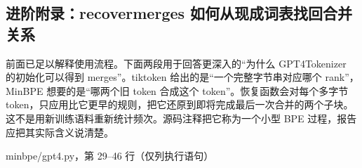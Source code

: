 \documentclass[11pt,a4paper]{article}
\newlength{\BpeDocTableWidth}
\newcommand{\BpeDocCodeInline}[1]{{\ttfamily #1}}
\newcommand{\BpeDocSubsection}[2]{\subsection{\texorpdfstring{#1}{#2}}}
\begin{document}
\BpeDocSubsection{进阶附录：\BpeDocCodeInline{recover\relax\allowbreak{}merges} 如何从现成词表找回合并关系}{进阶附录：recover\_merges 如何从现成词表找回合并关系}


前面已足以解释使用流程。下面两段用于回答更深入的“为什么 \BpeDocCodeInline{GPT4Tokenizer} 的初始化可以得到 \BpeDocCodeInline{merges}”。tiktoken 给出的是“一个完整字节串对应哪个 \BpeDocCodeInline{rank}”，MinBPE 想要的是“哪两个旧 \BpeDocCodeInline{token} 合成这个 \BpeDocCodeInline{token}”。恢复函数会对每个多字节 \BpeDocCodeInline{token}，只应用比它更早的规则，把它还原到即将完成最后一次合并的两个子块。这不是用新训练语料重新统计频次。源码注释把它称为一个小型 BPE 过程，报告应把其实际含义说清楚。


\begingroup\fontsize{8.9}{12.2}\selectfont{}
\setlength{\BpeDocTableWidth}{\dimexpr\linewidth-6\tabcolsep\relax}
\renewcommand{\arraystretch}{1.08}
{\small \BpeDocCodeInline{minbpe/\allowbreak{}gpt4.\allowbreak{}py}，第 29–46 行（仅列执行语句）}
\end{document}
